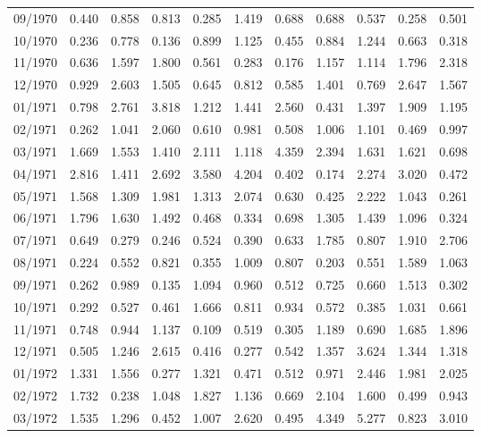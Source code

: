\begin{tabular}{lrrrrrrrrrr}
09/1970 &  0.440 &  0.858 &  0.813 &  0.285 &  1.419 &  0.688 &  0.688 &  0.537 &  0.258 &  0.501 \\
10/1970 &  0.236 &  0.778 &  0.136 &  0.899 &  1.125 &  0.455 &  0.884 &  1.244 &  0.663 &  0.318 \\
11/1970 &  0.636 &  1.597 &  1.800 &  0.561 &  0.283 &  0.176 &  1.157 &  1.114 &  1.796 &  2.318 \\
12/1970 &  0.929 &  2.603 &  1.505 &  0.645 &  0.812 &  0.585 &  1.401 &  0.769 &  2.647 &  1.567 \\
01/1971 &  0.798 &  2.761 &  3.818 &  1.212 &  1.441 &  2.560 &  0.431 &  1.397 &  1.909 &  1.195 \\
02/1971 &  0.262 &  1.041 &  2.060 &  0.610 &  0.981 &  0.508 &  1.006 &  1.101 &  0.469 &  0.997 \\
03/1971 &  1.669 &  1.553 &  1.410 &  2.111 &  1.118 &  4.359 &  2.394 &  1.631 &  1.621 &  0.698 \\
04/1971 &  2.816 &  1.411 &  2.692 &  3.580 &  4.204 &  0.402 &  0.174 &  2.274 &  3.020 &  0.472 \\
05/1971 &  1.568 &  1.309 &  1.981 &  1.313 &  2.074 &  0.630 &  0.425 &  2.222 &  1.043 &  0.261 \\
06/1971 &  1.796 &  1.630 &  1.492 &  0.468 &  0.334 &  0.698 &  1.305 &  1.439 &  1.096 &  0.324 \\
07/1971 &  0.649 &  0.279 &  0.246 &  0.524 &  0.390 &  0.633 &  1.785 &  0.807 &  1.910 &  2.706 \\
08/1971 &  0.224 &  0.552 &  0.821 &  0.355 &  1.009 &  0.807 &  0.203 &  0.551 &  1.589 &  1.063 \\
09/1971 &  0.262 &  0.989 &  0.135 &  1.094 &  0.960 &  0.512 &  0.725 &  0.660 &  1.513 &  0.302 \\
10/1971 &  0.292 &  0.527 &  0.461 &  1.666 &  0.811 &  0.934 &  0.572 &  0.385 &  1.031 &  0.661 \\
11/1971 &  0.748 &  0.944 &  1.137 &  0.109 &  0.519 &  0.305 &  1.189 &  0.690 &  1.685 &  1.896 \\
12/1971 &  0.505 &  1.246 &  2.615 &  0.416 &  0.277 &  0.542 &  1.357 &  3.624 &  1.344 &  1.318 \\
01/1972 &  1.331 &  1.556 &  0.277 &  1.321 &  0.471 &  0.512 &  0.971 &  2.446 &  1.981 &  2.025 \\
02/1972 &  1.732 &  0.238 &  1.048 &  1.827 &  1.136 &  0.669 &  2.104 &  1.600 &  0.499 &  0.943 \\
03/1972 &  1.535 &  1.296 &  0.452 &  1.007 &  2.620 &  0.495 &  4.349 &  5.277 &  0.823 &  3.010 \\

\end{tabular}
